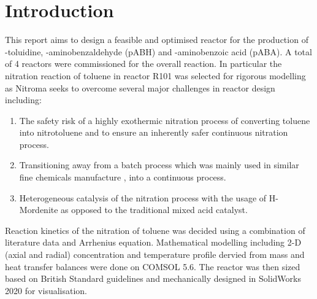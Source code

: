 \section{Introduction}
This report aims to design a feasible and optimised reactor for the production of \ortho-toluidine, \para-aminobenzaldehyde (pABH) and \para-aminobenzoic acid (pABA). A total of 4 reactors were commissioned for the overall reaction. 
In particular the nitration reaction of toluene in reactor R101 was selected for rigorous modelling as Nitroma seeks to overcome several major challenges in reactor design including:

\begin{enumerate}
    \item The safety risk of a highly exothermic nitration process of converting toluene into nitrotoluene and to ensure an inherently safer continuous nitration process. 
    \item Transitioning away from a batch process which was mainly used in similar fine chemicals manufacture \cite{di_miceli_raimondi_safety_2015}, into a continuous process. 
    \item Heterogeneous catalysis of the nitration process with the usage of H-Mordenite as opposed to the traditional mixed acid catalyst. 
\end{enumerate}

Reaction kinetics of the nitration of toluene was decided using a combination of literature data and Arrhenius equation. Mathematical modelling including 2-D (axial and radial) concentration and temperature profile dervied from mass and heat transfer balances were done on COMSOL 5.6.  The reactor was then sized based on British Standard guidelines and mechanically designed in SolidWorks 2020 for visualisation.


